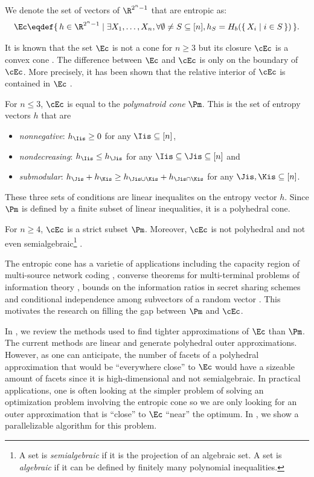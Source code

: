 \documentclass[12pt]{article}
\begin{document}
We denote the set of vectors of $\R^{2^n-1}$ that are entropic as:
\[ \Ec \eqdef \{\, h \in \R^{2^n-1} \mid \exists X_1, \ldots, X_n, \forall \emptyset \neq S \subseteq [n], h_S = H_b(\{\, X_i \mid i \in S\,\}) \,\}. \]


It is known that the set $\Ec$ is not a cone for $n \geq 3$ but its closure $\cEc$ is a convex cone \cite{zhang1997non}.
The difference between $\Ec$ and $\cEc$ is only on the boundary of $\cEc$.
More precisely, it has been shown that the relative interior of $\cEc$ is contained in $\Ec$ \cite{matus2007two}.

For $n \leq 3$, $\cEc$ is equal to the \emph{polymatroid cone} $\Pm$.
This is the set of entropy vectors $h$ %
that are
\begin{itemize}
  \item \emph{nonnegative}: $h_{\Iis} \geq 0$ for any $\Iis \subseteq [n]$,
  \item \emph{nondecreasing}: $h_{\Iis} \leq h_{\Jis}$ for any $\Iis \subseteq \Jis \subseteq [n]$ and
  \item \emph{submodular}: $h_{\Jis} + h_{\Kis} \geq h_{\Jis \cup \Kis} + h_{\Jis \cap \Kis}$ for any $\Jis, \Kis \subseteq [n]$.
\end{itemize}
These three sets of conditions are linear inequalites on the entropy vector $h$.
Since $\Pm$ is defined by a finite subset of linear inequalities,
it is a polyhedral cone.

For $n \geq 4$, $\cEc$ is a strict subset $\Pm$.
Moreover, $\cEc$ is not polyhedral \cite{matus2007infinitely} and not even semialgebraic\footnote{A set is \emph{semialgebraic} if it is the projection of an algebraic set. A set is \emph{algebraic} if it can be defined by finitely many polynomial inequalities.} \cite{mejia2015almost}.

The entropic cone has a varietie of applications including
the capacity region of multi-source network coding \cite{bassoli2013network},
converse theorems for multi-terminal problems of information theory \cite{yeung2012first},
bounds on the information ratios in secret sharing schemes \cite{beimel2011secret} and
conditional independence among subvectors of a random vector \cite{studeny2006probabilistic}.
This motivates the research on filling the gap between $\Pm$ and $\cEc$.

In , we review the methods used to find tighter approximations of $\Ec$ than $\Pm$.
The current methods are linear and generate polyhedral outer approximations.
However, as one can anticipate, the number of facets of a polyhedral approximation that would be ``everywhere close'' to $\Ec$ would have a sizeable amount of facets
since it is high-dimensional and not semialgebraic.
In practical applications, one is often looking at the simpler problem of solving an optimization problem involving the entropic cone
so we are only looking for an outer approximation that is ``close'' to $\Ec$ ``near'' the optimum.
In , we show a parallelizable algorithm for this problem.
\end{document}
